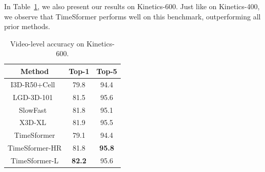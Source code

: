 \documentclass{article}
\begin{document}
In Table~\ref{k600_results_table}, we also present our results on Kinetics-600. Just like on Kinetics-400, we observe that TimeSformer performs well on this benchmark, outperforming all prior methods.





 




 \begin{table}
\centering
{\scriptsize
 \begin{tabular}{c c c }
 \hline
 {Method} & {Top-1} & {Top-5} \\ 
 \hline
I3D-R50+Cell~\cite{DBLP:conf/eccv/WangXNPRAKH20} & 79.8 & 94.4\\
LGD-3D-101~\cite{qiu2019learning} & 81.5 & 95.6\\ 
SlowFast~\cite{slowfast} & 81.8 & 95.1\\
X3D-XL~\cite{feichtenhofer2020x3d} & 81.9 & 95.5\\
\hline
TimeSformer & 79.1 & 94.4\\
TimeSformer-HR & 81.8 & \bf 95.8\\
TimeSformer-L & \bf 82.2 & 95.6\\
 \hline
 \end{tabular}
 }
\vspace{-0.1cm}
\caption{{Video-level accuracy on Kinetics-600}.\vspace{-0.1cm}} %
\label{k600_results_table}
 \end{table}
 
\end{document}
